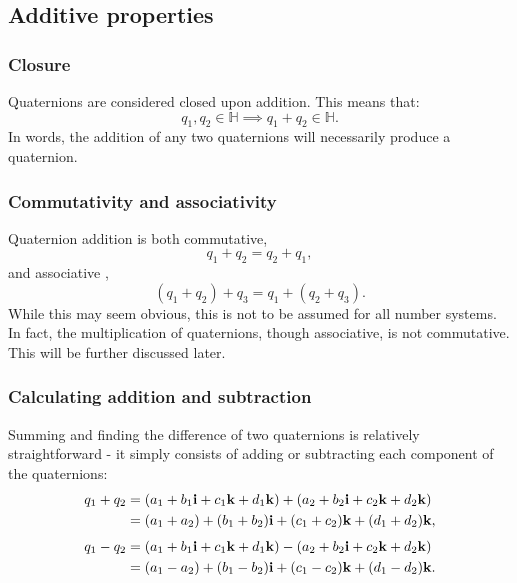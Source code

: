 \documentclass[11pt]{article}
\begin{document}
\subsection{Additive properties}

\subsubsection{Closure}

Quaternions are considered closed upon addition. This means that:
\begin{equation}
    q_1, q_2 \in \mathbb{H} \implies q_1 + q_2 \in \mathbb{H}.
\end{equation}
In words, the addition of any two quaternions will necessarily produce a quaternion. \cite{Illinois}

\subsubsection{Commutativity and associativity}

Quaternion addition is both commutative,
\begin{equation}
    q_1 + q_2 = q_2 + q_1,
\end{equation}
and associative \cite{Illinois},
\begin{equation}
    (q_1 + q_2) + q_3 = q_1 + (q_2 + q_3).
\end{equation}
While this may seem obvious, this is not to be assumed for all number systems. In fact, the multiplication of quaternions, though associative, is not commutative. This will be further discussed later.

\subsubsection{Calculating addition and subtraction}

Summing and finding the difference of two quaternions is relatively straightforward - it simply consists of adding or subtracting each component of the quaternions: \cite{Illinois}
\begin{equation}
    \begin{aligned}
        q_1 + q_2 & = (a_1 + b_1\vb{i} + c_1\vb{k} + d_1\vb{k}) + (a_2 + b_2\vb{i} + c_2\vb{k} + d_2\vb{k}) \\
                  & = (a_1+a_2) + (b_1+b_2)\vb{i} + (c_1+c_2)\vb{k} + (d_1+d_2)\vb{k},
    \end{aligned}
\end{equation}
\begin{equation}
    \begin{aligned}
        q_1 - q_2 & = (a_1 + b_1\vb{i} + c_1\vb{k} + d_1\vb{k}) - (a_2 + b_2\vb{i} + c_2\vb{k} + d_2\vb{k}) \\
                  & = (a_1-a_2) + (b_1-b_2)\vb{i} + (c_1-c_2)\vb{k} + (d_1-d_2)\vb{k}.
    \end{aligned}
\end{equation}
\end{document}
